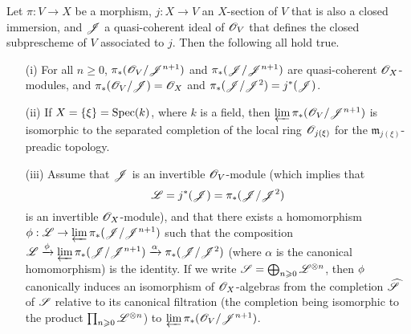 \begin{lemma}[8.10.1]
\label{II.8.10.1}
Let $\pi:V\to X$ be a morphism, $j:X\to V$ an $X$-section of $V$ that is also a closed immersion, and $\mathscr{J}$ a quasi-coherent ideal of $\mathscr{O}_V$ that defines the closed subprescheme of $V$ associated to $j$.
Then the following all hold true.
\begin{enumerate}
  \item[\rm{(i)}] For all $n\geq0$, $\pi_*(\mathscr{O}_V/\mathscr{J}^{n+1})$ and $\pi_*(\mathscr{J}/\mathscr{J}^{n+1})$ are quasi-coherent $\mathscr{O}_X$-modules, and $\pi_*(\mathscr{O}_V/\mathscr{J})=\mathscr{O}_X$ and $\pi_*(\mathscr{J}/\mathscr{J}^2)=j^*(\mathscr{J})$.
  \item[\rm{(ii)}] If $X=\{\xi\}=\operatorname{Spec}(k)$, where $k$ is a field, then $\varprojlim\pi_*(\mathscr{O}_V/\mathscr{J}^{n+1})$ is isomorphic to the separated completion of the local ring $\mathscr{O}_{j(\xi)}$ for the $\mathfrak{m}_{j(\xi)}$-preadic topology.
  \item[\rm{(iii)}] Assume that $\mathscr{J}$ is an invertible $\mathscr{O}_V$-module (which implies that
    \[
      \mathscr{L} = j^*(\mathscr{J}) = \pi_*(\mathscr{J}/\mathscr{J}^2)
    \]
    is an invertible $\mathscr{O}_X$-module), and that there exists a homomorphism $\vphi:\sh{L}\to\varprojlim\pi_*(\sh{J}/\sh{J}^{n+1})$ such that the composition $\mathscr{L} \xrightarrow{\phi} \varprojlim\pi_*(\mathscr{J}/\mathscr{J}^{n+1}) \xrightarrow{\alpha} \pi_*(\mathscr{J}/\mathscr{J}^2)$ (where $\alpha$ is the canonical homomorphism) is the identity.
    If we write $\mathscr{S}=\bigoplus_{n\geqslant0}\mathscr{L}^{\otimes n}$, then $\phi$ canonically induces an isomorphism of $\mathscr{O}_X$-algebras from the completion $\widehat{\mathscr{S}}$ of $\mathscr{S}$ relative to its canonical filtration (the completion being isomorphic to the product $\prod_{n\geqslant0}\mathscr{L}^{\otimes n}$) to $\varprojlim\pi_*(\mathscr{O}_V/\mathscr{J}^{n+1})$.
\end{enumerate}
\end{lemma}

